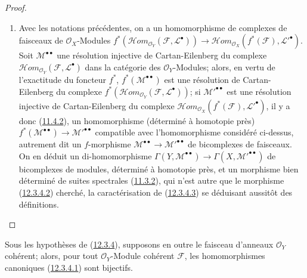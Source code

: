 \begin{proof}
\begin{enumerate}
\item[{\rm(ii)}]
Avec les notations précédentes, on a un homomorphisme de complexes de
faisceaux de $\mathcal O_X$-Modules
$f^*(\mathcal{H}om_{\mathcal O_Y}(\mathcal F,\mathcal L^\bullet))\longrightarrow\mathcal{H}om_{\mathcal O_X}(f^*(\mathcal F),\mathcal L'^\bullet)$.
Soit $\mathcal M^{\bullet\bullet}$ une résolution injective de
Cartan-Eilenberg du complexe
$\mathcal{H}om_{\mathcal O_Y}(\mathcal F,\mathcal L^\bullet)$ dans la
catégorie des $\mathcal O_Y$-Modules; alors, en vertu de l'exactitude du
foncteur $f^*$, $f^*(\mathcal M^{\bullet\bullet})$ est une résolution de
Cartan-Eilenberg du complexe
$f^*(\mathcal{H}om_{\mathcal O_Y}(\mathcal F,\mathcal L^\bullet))$; si
$\mathcal M'^{\bullet\bullet}$ est une résolution injective de
Cartan-Eilenberg du complexe
$\mathcal{H}om_{\mathcal O_X}(f^*(\mathcal F),\mathcal L'^\bullet)$, il y a
donc (\hyperref[0.11.4.2-fr]{11.4.2}), un homomorphisme (déterminé à
homotopie près)
$f^*(\mathcal M^{\bullet\bullet})\longrightarrow\mathcal M'^{\bullet\bullet}$
compatible avec l'homomorphisme considéré ci-dessus, autrement dit un
$f$-morphisme $\mathcal M^{\bullet\bullet}\to
\mathcal M'^{\bullet\bullet}$ de bicomplexes de faisceaux. On en déduit un
di-homomorphisme
$\Gamma(Y,\mathcal M^{\bullet\bullet})\to
\Gamma(X,\mathcal M'^{\bullet\bullet})$ de bicomplexes de modules, déterminé
à homotopie près, et un morphisme bien déterminé de suites spectrales
(\hyperref[0.11.3.2-fr]{11.3.2}), qui n'est autre que le morphisme
(\hyperref[0.12.3.4.2-fr]{12.3.4.2}) cherché, la caractérisation de
(\hyperref[0.12.3.4.3-fr]{12.3.4.3}) se déduisant aussitôt des définitions.
\end{enumerate}
\end{proof}

\begin{proposition}[12.3.5]
\label{0.12.3.5-fr}
Sous les hypothèses de (\hyperref[0.12.3.4-fr]{12.3.4}), supposons en
outre le faisceau d'anneaux $\mathcal O_Y$ cohérent; alors, pour tout
$\mathcal O_Y$-Module cohérent $\mathcal F$, les homomorphismes canoniques
(\hyperref[0.12.3.4.1-fr]{12.3.4.1}) sont bijectifs.
\end{proposition}

